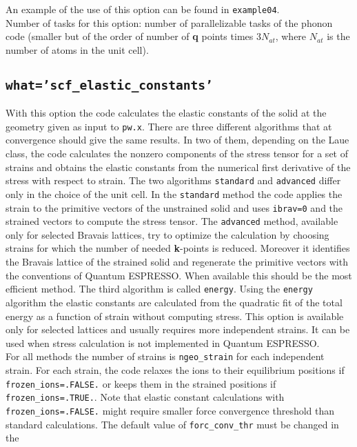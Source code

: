\documentclass[12pt,a4paper]{article}
\def\qe{{\sc Quantum ESPRESSO}}
\begin{document}
An example of the use of this option can be found in \texttt{example04}. \\
Number of tasks for this option: number of parallelizable tasks of the 
phonon code (smaller but of the order of number of {\bf q} points times 
$3 N_{at}$, where $N_{at}$ is the number of atoms in the unit cell).

\subsection{\texttt{what='scf\_elastic\_constants'}}
With this option the code calculates the elastic constants of the solid
at the geometry given as input to \texttt{pw.x}. 
There are three different algorithms that at convergence should give the
same results. In two of them, depending on the Laue class, the code 
calculates the nonzero components of the stress tensor for a set of strains
and obtains the elastic constants from the numerical first derivative
of the stress with respect to strain.
The two algorithms \texttt{standard} and \texttt{advanced} differ
only in the choice of the unit cell. In the \texttt{standard} method the
code applies the strain to the primitive vectors of the unstrained solid
and uses \texttt{ibrav=0} and the strained vectors to compute the stress
tensor.
The \texttt{advanced}  method, available only for selected Bravais lattices, 
try to optimize the calculation by choosing strains for which the number
of needed {\bf k}-points is reduced. Moreover it identifies the 
Bravais lattice of the strained solid and regenerate the primitive
vectors with the conventions of \qe. When available this should be the
most efficient method.
The third algorithm is called \texttt{energy}.
Using the \texttt{energy} algorithm the elastic constants are calculated 
from the quadratic fit of the total energy as a function of strain
without computing stress. This option is available only for selected 
lattices and usually requires more independent strains. It can be
used when stress calculation is not implemented in \qe.\\
For all methods the number of strains is \texttt{ngeo\_strain}
for each independent strain. 
For each strain, the code relaxes the ions to their equilibrium 
positions if \texttt{frozen\_ions=.FALSE.} or keeps them
in the strained positions if \texttt{frozen\_ions=.TRUE.}. 
Note that elastic constant calculations with \texttt{frozen\_ions=.FALSE.}
might require smaller force convergence threshold than standard calculations. 
The default value of \texttt{forc\_conv\_thr} must be changed in the 
\end{document}
